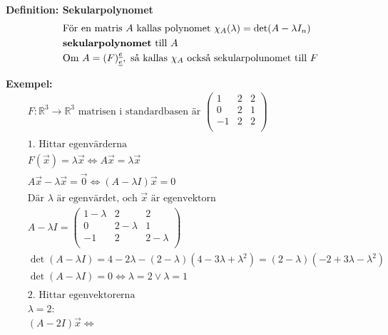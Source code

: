 \textbf{Definition: Sekularpolynomet}
\begin{align*}
  &\quad  \text{För en matris $A$ kallas polynomet } \chi_A(\lambda) = \det(A-\lambda I_n) \\
  &\quad  \text{\textbf{sekularpolynomet} till $A$ } \\
  &\quad  \text{Om } A= {(F)}^{\underline{e}}_{\underline{e}}, \text{ så kallas $\chi_A$ också
  sekularpolunomet till $F$} \\
\end{align*}

\textbf{Exempel:}
\begin{align*}
  &\quad  F:\mathbb{R}^3\to\mathbb{R}^3 \text{ matrisen i standardbasen är }
  \left(\begin{array}{ccc}
    1 & 2 & 2  \\
    0 & 2 & 1  \\
   -1 & 2 & 2  \\
  \end{array}\right) \\
  &\quad  \\
  &\quad  \text{1. Hittar egenvärderna} \\
  &\quad  F (\vec{x}) = \lambda\vec{x} \Leftrightarrow{} A\vec{x}=\lambda\vec{x} \\
  &\quad  A\vec{x}-\lambda\vec{x} = \vec{0} \Leftrightarrow{} (A-\lambda{I})\vec{x} = 0 \\
  &\quad  \text{Där $\lambda$ är egenvärdet, och $\vec{x}$ är egenvektorn} \\
  &\quad  A-\lambda{I} =
  \left(\begin{array}{ccc}
    1-\lambda & 2         & 2          \\
    0         & 2-\lambda & 1          \\
   -1         & 2         & 2-\lambda  \\
  \end{array}\right) \\
  &\quad  \det(A-\lambda{I}) = 4 -2\lambda{} -(2 -\lambda)(4 -3\lambda+\lambda^2)
  = (2-\lambda)(-2 +3\lambda -\lambda^2) \\
  &\quad  \det(A-\lambda{I}) = 0 \Leftrightarrow{} \lambda=2 \lor{} \lambda=1 \\
  &\quad  \\
  &\quad  \text{2. Hittar egenvektorerna} \\
  &\quad  \lambda=2: \\
  &\quad  (A-2I)\vec{x} \Leftrightarrow{}

\end{align*}
